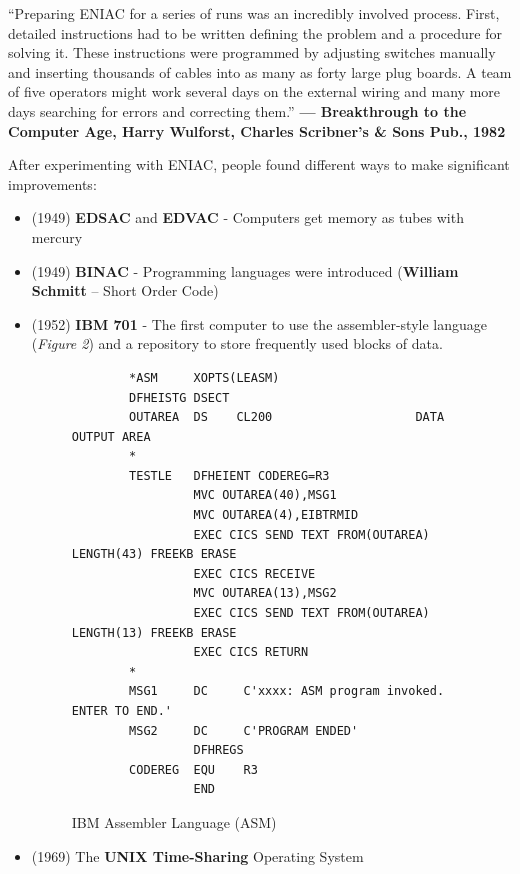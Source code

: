 \documentclass[12pt]{article}
\begin{document}
\begin{center}
    \footnotesize“Preparing ENIAC for a series of runs was an incredibly involved process. First, detailed instructions had to be written defining the problem and a procedure for solving it. These instructions were programmed by adjusting switches manually and inserting thousands of cables into as many as forty large plug boards. A team of five operators might work several days on the external wiring and many more days searching for errors and correcting them.”\textbf{ — Breakthrough to the Computer Age, Harry Wulforst, Charles Scribner’s \& Sons Pub., 1982}
\end{center}

\noindent After experimenting with ENIAC, people found different ways to make significant improvements:
\begin{itemize}
    \item (1949) \textbf{EDSAC} and \textbf{EDVAC} - Computers get memory as tubes with mercury
    \item (1949) \textbf{BINAC} - Programming languages were introduced (\textbf{William Schmitt} – Short Order Code)
    \item (1952) \textbf{IBM 701} - The first computer to use the assembler-style language (\textit{Figure 2}) and a repository to store frequently used blocks of data.
          \begin{figure}[H]
              \centering
              \begin{verbatim}
        *ASM     XOPTS(LEASM)
        DFHEISTG DSECT
        OUTAREA  DS    CL200                    DATA OUTPUT AREA
        *
        TESTLE   DFHEIENT CODEREG=R3
                 MVC OUTAREA(40),MSG1
                 MVC OUTAREA(4),EIBTRMID
                 EXEC CICS SEND TEXT FROM(OUTAREA) LENGTH(43) FREEKB ERASE
                 EXEC CICS RECEIVE
                 MVC OUTAREA(13),MSG2
                 EXEC CICS SEND TEXT FROM(OUTAREA) LENGTH(13) FREEKB ERASE
                 EXEC CICS RETURN
        *
        MSG1     DC     C'xxxx: ASM program invoked. ENTER TO END.'
        MSG2     DC     C'PROGRAM ENDED'
                 DFHREGS
        CODEREG  EQU    R3
                 END
        \end{verbatim}
              \caption{IBM Assembler Language (ASM)}
          \end{figure}
    \item (1969) The \textbf{UNIX Time-Sharing} Operating System
\end{itemize}
\end{document}
